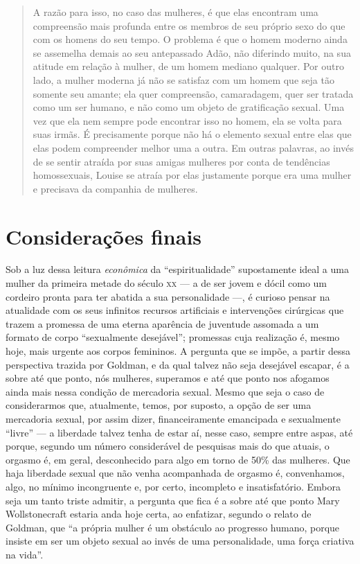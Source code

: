 \begin{quote}
A razão para isso, no caso das mulheres, é que elas encontram uma
compreensão mais profunda entre os membros de seu próprio sexo do que
com os homens do seu tempo. O problema é que o homem moderno ainda se
assemelha demais ao seu antepassado Adão, não diferindo muito, na sua
atitude em relação à mulher, de um homem mediano qualquer. Por outro
lado, a mulher moderna já não se satisfaz com um homem que seja tão
somente seu amante; ela quer compreensão, camaradagem, quer ser tratada
como um ser humano, e não como um objeto de gratificação sexual. Uma vez
que ela nem sempre pode encontrar isso no homem, ela se volta para suas
irmãs. É precisamente porque não há o elemento sexual entre elas que
elas podem compreender melhor uma a outra. Em outras palavras, ao invés
de se sentir atraída por suas amigas mulheres por conta de tendências
homossexuais, Louise se atraía por elas justamente porque era uma mulher
e precisava da companhia de mulheres.
\end{quote}

\section{Considerações finais}

Sob a luz dessa leitura \emph{econômica} da ``espiritualidade''
supostamente ideal a uma mulher da primeira metade do século \textsc{xx} --- a de
ser jovem e dócil como um cordeiro pronta para ter abatida a sua
personalidade ---, é curioso pensar na atualidade com os seus infinitos
recursos artificiais e intervenções cirúrgicas que trazem a promessa de
uma eterna aparência de juventude assomada a um formato de corpo
``sexualmente desejável''; promessas cuja realização é, mesmo hoje, mais
urgente aos corpos femininos. A pergunta que se impõe, a partir dessa
perspectiva trazida por Goldman, e da qual talvez não seja desejável
escapar, é a sobre até que ponto, nós mulheres, superamos e até que
ponto nos afogamos ainda mais nessa condição de mercadoria sexual. Mesmo
que seja o caso de considerarmos que, atualmente, temos, por suposto, a
opção de ser uma mercadoria sexual, por assim dizer, financeiramente
emancipada e sexualmente ``livre'' --- a liberdade talvez tenha de estar
aí, nesse caso, sempre entre aspas, até porque, segundo um número
considerável de pesquisas mais do que atuais, o orgasmo é, em geral,
desconhecido para algo em torno de 50\% das mulheres. Que haja liberdade
sexual que não venha acompanhada de orgasmo é, convenhamos, algo, no
mínimo incongruente e, por certo, incompleto e insatisfatório. Embora
seja um tanto triste admitir, a pergunta que fica é a sobre até que
ponto Mary Wollstonecraft estaria anda hoje certa, ao enfatizar, segundo
o relato de Goldman, que ``a própria mulher é um obstáculo ao progresso
humano, porque insiste em ser um objeto sexual ao invés de uma
personalidade, uma força criativa na vida''.

